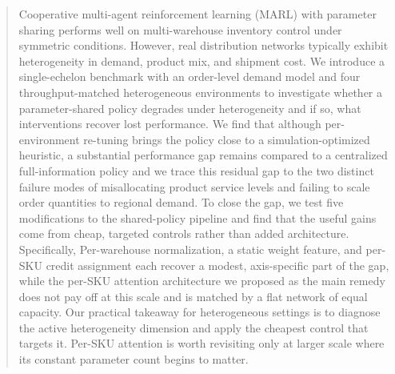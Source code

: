 \begin{abstract}
    Cooperative multi-agent reinforcement learning (MARL) with parameter sharing performs well on multi-warehouse inventory control under symmetric conditions. However, real distribution networks typically exhibit heterogeneity in demand, product mix, and shipment cost. We introduce a single-echelon benchmark with an order-level demand model and four throughput-matched heterogeneous environments to investigate whether a parameter-shared policy degrades under heterogeneity and if so, what interventions recover lost performance. We find that although per-environment re-tuning brings the policy close to a simulation-optimized heuristic, a substantial performance gap remains compared to a centralized full-information policy and we trace this residual gap to the two distinct failure modes of misallocating product service levels and failing to scale order quantities to regional demand. To close the gap, we test five modifications to the shared-policy pipeline and find that the useful gains come from cheap, targeted controls rather than added architecture. Specifically, Per-warehouse normalization, a static weight feature, and per-SKU credit assignment each recover a modest, axis-specific part of the gap, while the per-SKU attention architecture we proposed as the main remedy does not     pay off at this scale and is matched by a flat network of equal capacity. Our practical takeaway for heterogeneous settings is to diagnose the active heterogeneity dimension and apply the cheapest control that targets it. Per-SKU attention is worth revisiting only at larger scale where its constant parameter count begins to matter.
    \end{abstract}
